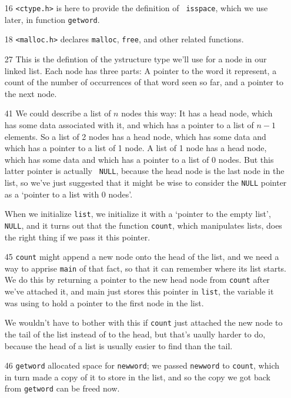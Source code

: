 \begin{itemize}
\item[16] {\tt <ctype.h>} is here to provide the definition of {\tt
isspace}, which we use later, in function  {\tt getword}.  
\item[18] {\tt <malloc.h>} declares {\tt malloc}, {\tt free}, and other
related functions. 
\item[27] This is the defintion of the ystructure type we'll use for a
node in our linked list.  Each node has three parts:  A pointer to the
word it represent, a count of the number of occurrences of that word
seen so far, and a pointer to the next node.   
\item[41]  We could describe a list of $n$ nodes this way:  It has a
head node, which has some data associated with it, and which has a
pointer to a list of $n-1$ elements.  So a list of 2 nodes has a head
node, which has some data and which has a pointer to a list of 1 node.
A list of 1 node has a head node, which has some data and which has a
pointer to a list of 0 nodes.  But this latter pointer is actually {\tt
NULL}, because the head node is the last node in the list, so we've just
suggested that it might be wise to consider the {\tt NULL} pointer as a
`pointer to a list with 0 nodes'.

When we initialize {\tt list}, we initialize it with a `pointer to the
empty list', {\tt NULL}, and it turns out that the function {\tt count},
which manipulates lists, does the right thing if we pass it this
pointer.  

\item[45] {\tt count} might append a new node onto the head of the list,
and we need a way to apprise {\tt main} of that fact, so that it can
remember where its list starts.  We do this by returning a pointer to
the new head node from {\tt count} after we've attached it, and main
just stores this pointer in {\tt list}, the variable it was using to
hold a pointer to the first node in the list.

We wouldn't have to bother with this if {\tt count} just attached the
new node to the tail of the list instead of to the head, but that's
uaully harder to do, because the head of a list is usually easier to
find than the tail.  
\item[46] {\tt getword} allocated space for {\tt newword}; we passed
{\tt newword} to {\tt count}, which in turn made a copy of it to store
in the list, and so the copy we got back from {\tt getword} can be freed
now.  


\end{itemize}

